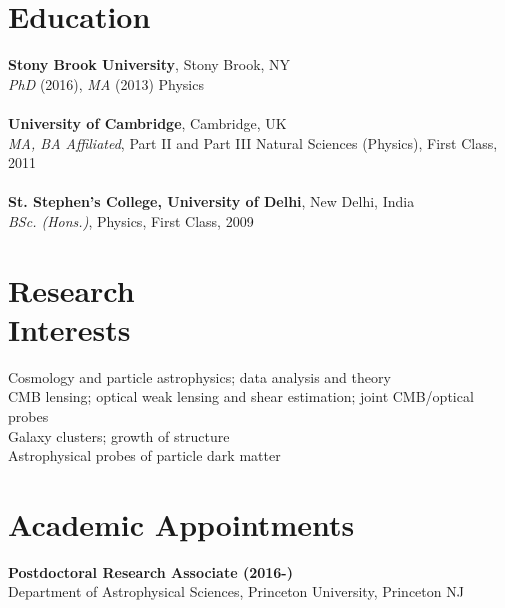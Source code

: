 \documentclass[10pt,margin]{res}
\begin{document}
\begin{resume}

\section{Education}
\textbf{Stony Brook University}, Stony Brook, NY\\
{\sl PhD} (2016), {\sl MA} (2013) Physics
\\ \\
\textbf{University of Cambridge}, Cambridge, UK\\
{\sl MA, BA Affiliated}, Part II and Part III Natural Sciences (Physics), First Class, 2011\hfill 
\\ \\
\textbf{St. Stephen's College, University of Delhi}, New Delhi, India\\
{\sl BSc. (Hons.)}, Physics, First Class, 2009\hfill 

\section{Research \\Interests}
Cosmology and particle astrophysics; data analysis and theory \\
CMB lensing; optical weak lensing and shear estimation; joint CMB/optical probes \\
Galaxy clusters; growth of structure \\
Astrophysical probes of particle dark matter

\section{Academic Appointments}
\textbf{Postdoctoral Research Associate (2016-)}\\
Department of Astrophysical Sciences, Princeton University, Princeton NJ
\\



\end{resume}
\end{document}
